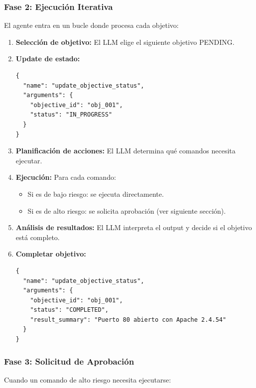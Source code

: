 \subsubsection{Fase 2: Ejecución Iterativa}

El agente entra en un bucle donde procesa cada objetivo:

\begin{enumerate}
    \item \textbf{Selección de objetivo:} El LLM elige el siguiente objetivo PENDING.
    
    \item \textbf{Update de estado:}
    \begin{verbatim}
{
  "name": "update_objective_status",
  "arguments": {
    "objective_id": "obj_001",
    "status": "IN_PROGRESS"
  }
}
    \end{verbatim}
    
    \item \textbf{Planificación de acciones:} El LLM determina qué comandos necesita ejecutar.
    
    \item \textbf{Ejecución:} Para cada comando:
    \begin{itemize}
        \item Si es de bajo riesgo: se ejecuta directamente.
        \item Si es de alto riesgo: se solicita aprobación (ver siguiente sección).
    \end{itemize}
    
    \item \textbf{Análisis de resultados:} El LLM interpreta el output y decide si el objetivo está completo.
    
    \item \textbf{Completar objetivo:}
    \begin{verbatim}
{
  "name": "update_objective_status",
  "arguments": {
    "objective_id": "obj_001",
    "status": "COMPLETED",
    "result_summary": "Puerto 80 abierto con Apache 2.4.54"
  }
}
    \end{verbatim}
\end{enumerate}

\subsubsection{Fase 3: Solicitud de Aprobación}

Cuando un comando de alto riesgo necesita ejecutarse:

